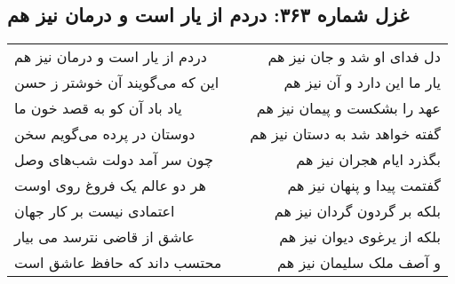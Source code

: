 \begin{center}
\section*{غزل شماره ۳۶۳: دردم از یار است و درمان نیز هم}
\label{sec:sh363}
\begin{longtable}{l p{0.5cm} r}
دردم از یار است و درمان نیز هم
&&
دل فدای او شد و جان نیز هم
\\
این که می‌گویند آن خوشتر ز حسن
&&
یار ما این دارد و آن نیز هم
\\
یاد باد آن کو به قصد خون ما
&&
عهد را بشکست و پیمان نیز هم
\\
دوستان در پرده می‌گویم سخن
&&
گفته خواهد شد به دستان نیز هم
\\
چون سر آمد دولت شب‌های وصل
&&
بگذرد ایام هجران نیز هم
\\
هر دو عالم یک فروغ روی اوست
&&
گفتمت پیدا و پنهان نیز هم
\\
اعتمادی نیست بر کار جهان
&&
بلکه بر گردون گردان نیز هم
\\
عاشق از قاضی نترسد می بیار
&&
بلکه از یرغوی دیوان نیز هم
\\
محتسب داند که حافظ عاشق است
&&
و آصف ملک سلیمان نیز هم
\\
\end{longtable}
\end{center}
